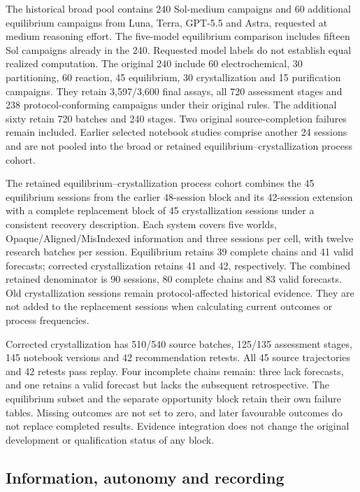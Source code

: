 \documentclass[12pt,a4paper]{article}
\begin{document}
The historical broad pool contains 240 Sol-medium campaigns and 60 additional equilibrium campaigns from Luna, Terra, GPT-5.5 and Astra, requested at medium reasoning effort. The five-model equilibrium comparison includes fifteen Sol campaigns already in the 240. Requested model labels do not establish equal realized computation. The original 240 include 60 electrochemical, 30 partitioning, 60 reaction, 45 equilibrium, 30 crystallization and 15 purification campaigns. They retain 3,597/3,600 final assays, all 720 assessment stages and 238 protocol-conforming campaigns under their original rules. The additional sixty retain 720 batches and 240 stages. Two original source-completion failures remain included. Earlier selected notebook studies comprise another 24 sessions and are not pooled into the broad or retained equilibrium--crystallization process cohort.

The retained equilibrium--crystallization process cohort combines the 45 equilibrium sessions from the earlier 48-session block and its 42-session extension with a complete replacement block of 45 crystallization sessions under a consistent recovery description. Each system covers five worlds, Opaque/Aligned/MisIndexed information and three sessions per cell, with twelve research batches per session. Equilibrium retains 39 complete chains and 41 valid forecasts; corrected crystallization retains 41 and 42, respectively. The combined retained denominator is 90 sessions, 80 complete chains and 83 valid forecasts. Old crystallization sessions remain protocol-affected historical evidence. They are not added to the replacement sessions when calculating current outcomes or process frequencies.

Corrected crystallization has 510/540 source batches, 125/135 assessment stages, 145 notebook versions and 42 recommendation retests. All 45 source trajectories and 42 retests pass replay. Four incomplete chains remain: three lack forecasts, and one retains a valid forecast but lacks the subsequent retrospective. The equilibrium subset and the separate opportunity block retain their own failure tables. Missing outcomes are not set to zero, and later favourable outcomes do not replace completed results. Evidence integration does not change the original development or qualification status of any block.

\subsection{Information, autonomy and recording}\label{information-autonomy-and-recording}
\end{document}
